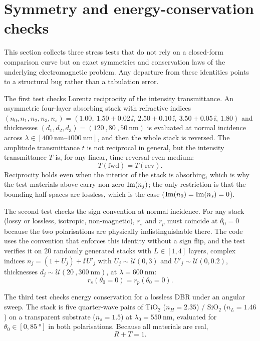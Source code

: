 \section{Symmetry and energy-conservation checks}

This section collects three stress tests that do not rely on a closed-form
comparison curve but on exact symmetries and conservation laws of the
underlying electromagnetic problem. Any departure from these identities
points to a structural bug rather than a tabulation error.

The first test checks Lorentz reciprocity of the intensity transmittance.
An asymmetric four-layer absorbing stack with refractive indices
$(n_0, n_1, n_2, n_3, n_s) = (1.00,\ 1.50+0.02\,\ii,\ 2.50+0.10\,\ii,\
3.50+0.05\,\ii,\ 1.80)$ and thicknesses
$(d_1, d_2, d_3) = (\SI{120}{}, \SI{80}{}, \SI{50}{\nano\metre})$ is
evaluated at normal incidence across
$\lambda \in [\SIrange{400}{1000}{\nano\metre}]$, and then the whole stack
is reversed. The amplitude transmittance $t$ is not reciprocal in general,
but the intensity transmittance $T$ is, for any linear, time-reversal-even
medium:
\begin{equation}
  T(\mathrm{fwd}) = T(\mathrm{rev}). \label{eq:sym-rec}
\end{equation}
Reciprocity holds even when the interior of the stack is absorbing, which
is why the test materials above carry non-zero $\operatorname{Im}(n_j)$; the only
restriction is that the bounding half-spaces are lossless, which is the
case ($\operatorname{Im}(n_0) = \operatorname{Im}(n_s) = 0$).

The second test checks the sign convention at normal incidence. For any
stack (lossy or lossless, isotropic, non-magnetic), $r_s$ and $r_p$ must
coincide at $\theta_0 = 0$ because the two polarisations are physically
indistinguishable there. The code uses the convention that enforces this
identity without a sign flip, and the test verifies it on 20 randomly
generated stacks with $L \in [1, 4]$ layers, complex indices
$n_j = (1 + U_j) + \ii\,U'_j$ with $U_j \sim \mathcal{U}(0, 3)$ and
$U'_j \sim \mathcal{U}(0, 0.2)$, thicknesses
$d_j \sim \mathcal{U}(\SI{20}{}, \SI{300}{\nano\metre})$, at
$\lambda = \SI{600}{\nano\metre}$:
\begin{equation}
  r_s(\theta_0 = 0) = r_p(\theta_0 = 0). \label{eq:sym-normal}
\end{equation}

The third test checks energy conservation for a lossless DBR under an
angular sweep. The stack is five quarter-wave pairs of
TiO$_2$ ($n_H = 2.35$) / SiO$_2$ ($n_L = 1.46$) on a transparent substrate
($n_s = 1.5$) at $\lambda_0 = \SI{550}{\nano\metre}$, evaluated for
$\theta_0 \in [0, \SI{85}{\degree}]$ in both polarisations. Because all
materials are real,
\begin{equation}
  R + T = 1. \label{eq:sym-energy}
\end{equation}


